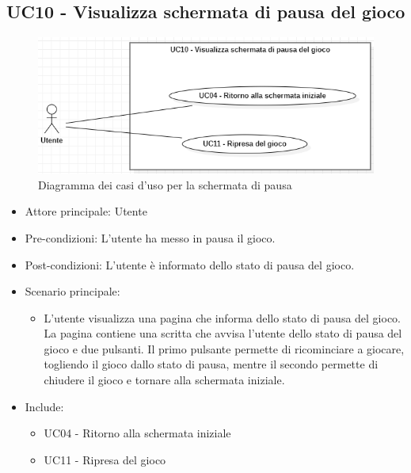 \subsection{UC10 - Visualizza schermata di pausa del gioco}
\begin{figure}[h]
    \centering
    \includegraphics[width=400pt]{images/usecase/UC10.png}
    \caption{Diagramma dei casi d'uso per la schermata di pausa}
    \label{fig:UC10}
\end{figure}
\begin{itemize}
    \item Attore principale: Utente
    \item Pre-condizioni: L'utente ha messo in pausa il gioco.
    \item Post-condizioni: L'utente è informato dello stato di pausa del gioco.
    \item Scenario principale: \begin{itemize}
        \item L'utente visualizza una pagina che informa dello stato di pausa del gioco. La pagina contiene una scritta che avvisa l'utente dello stato di pausa del gioco e due pulsanti. Il primo pulsante permette di ricominciare a giocare, togliendo il gioco dallo stato di pausa, mentre il secondo permette di chiudere il gioco e tornare alla schermata iniziale.
    \end{itemize}
    \item Include: \begin{itemize}
        \item UC04 - Ritorno alla schermata iniziale
        \item UC11 - Ripresa del gioco
    \end{itemize}
\end{itemize}

